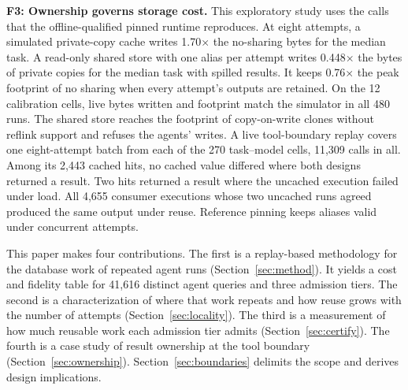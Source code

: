 \textbf{F3: Ownership governs storage cost.} This exploratory study uses the calls that the offline-qualified pinned runtime reproduces. At eight attempts, a simulated private-copy cache writes 1.70$\times$ the no-sharing bytes for the median task. A read-only shared
store with one alias per attempt writes 0.448$\times$ the bytes of private copies for the median task with spilled
results. It keeps 0.76$\times$ the peak footprint of no sharing when every attempt's outputs are retained. On the 12
calibration cells, live bytes written and footprint match the simulator in all 480 runs. The shared store reaches the
footprint of copy-on-write clones without reflink support and refuses the agents' writes. A live tool-boundary replay
covers one eight-attempt batch from each of the 270 task--model cells, 11,309 calls in all. Among its 2,443 cached hits, no cached value differed where both designs returned a result. Two hits returned a result where the uncached execution failed under load. All 4,655 consumer executions whose two uncached runs agreed produced the same output under reuse. Reference pinning keeps aliases valid under concurrent attempts.

This paper makes four contributions. The first is a replay-based methodology for the database work of repeated agent runs (Section~\ref{sec:method}). It yields a cost and fidelity table for 41,616 distinct agent queries and three admission tiers. The second is a characterization of where that work repeats and how reuse grows with the
number of attempts (Section~\ref{sec:locality}). The third is a measurement of how much reusable work each admission
tier admits (Section~\ref{sec:certify}). The fourth is a case study of result ownership at the tool boundary
(Section~\ref{sec:ownership}). Section~\ref{sec:boundaries} delimits the scope and derives design implications.
